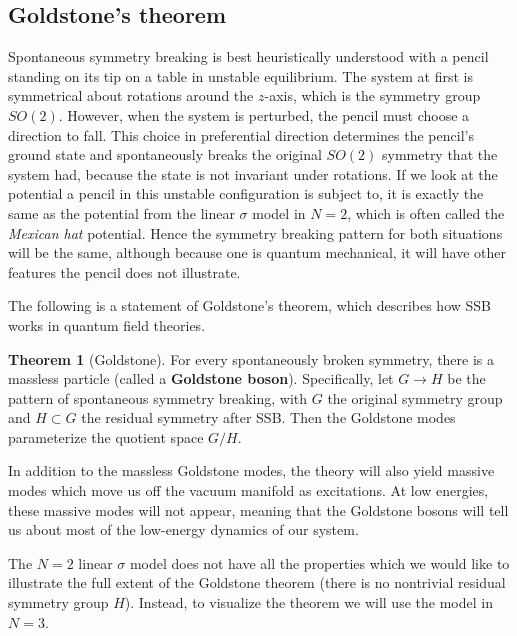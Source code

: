 \documentclass[11pt, oneside]{article}   	%
\theoremstyle{definition}
\newtheorem{theorem}{Theorem}[section]
\numberwithin{equation}{subsection}		%
\begin{document}
\subsection{Goldstone's theorem}

Spontaneous symmetry breaking is best heuristically understood with a pencil standing on its tip on a table in unstable 
equilibrium. The system at first is symmetrical about rotations around the $z$-axis, which is the symmetry group $SO(2)$. 
However, when the system is perturbed, the pencil must choose a direction to fall. This choice in preferential direction 
determines the pencil's ground state and spontaneously breaks the original $SO(2)$ symmetry that the system had, because 
the state is not invariant under rotations. If we look at the potential a pencil in this unstable configuration is subject to, it is 
exactly the same as the potential from the linear $\sigma$ model in $N = 2$, which is often called the \textit{Mexican hat} 
potential. Hence the symmetry breaking pattern for both situations will be the same, although because one is quantum 
mechanical, it will have other features the pencil does not illustrate.

The following is a statement of Goldstone's theorem, which describes how SSB works in quantum field theories.
\begin{theorem}[Goldstone]
	For every spontaneously broken symmetry, there is a massless particle (called a \textbf{Goldstone boson}). Specifically, 
	let $G\rightarrow H$ be the pattern of spontaneous symmetry breaking, with $G$ the original symmetry group and 
	$H\subset G$ the residual symmetry after SSB. Then the Goldstone modes parameterize the quotient space $G / H$.
\end{theorem}
In addition to the massless Goldstone modes, the theory will also yield massive modes which move us off the vacuum 
manifold as excitations. At low energies, these massive modes will not appear, meaning that the Goldstone bosons will 
tell us about most of the low-energy dynamics of our system. 

The $N = 2$ linear $\sigma$ model does not have all the properties which we would like to illustrate the full extent of the 
Goldstone theorem (there is no nontrivial residual symmetry group $H$). Instead, to visualize the theorem we will use the 
model in $N = 3$.
\end{document}
